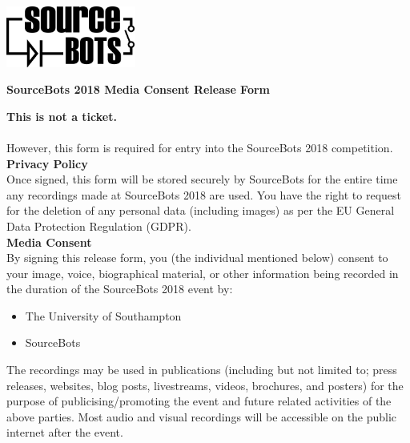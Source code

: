 \documentclass[a4paper]{article}
\begin{document}
\newcommand{\compyear}{2018\xspace}
\newcommand{\competition}{SourceBots \compyear}

\begin{minipage}[c]{0.30\textwidth}
\includegraphics[height=2cm]{fig-SourceBots}
\end{minipage}
\hspace{0.03\textwidth}
\begin{minipage}[c]{0.67\textwidth}
\begin{center}
{\large \textbf{\competition Media Consent Release Form} \par}
\end{center}
\end{minipage}
\vspace{1cm}

\textbf{This is not a ticket.}\\\\ However, this form is required for entry into the \competition competition.\\

\vspace{0.3cm}
\textbf{\large Privacy Policy}\\

Once signed, this form will be stored securely by SourceBots for the entire time any recordings made at \competition are used. You have the right to request for the deletion of any personal data (including images) as per the EU General Data Protection Regulation (GDPR).\\

\vspace{0.3cm}
\textbf{\large Media Consent}\\

By signing this release form, you (the individual mentioned below) consent to your image, voice, biographical material, or other information being recorded in the duration of the \competition event by:
\begin{itemize}
    \item The University of Southampton
    \item SourceBots
\end{itemize}
 The recordings may be used in publications (including but not limited to; press releases, websites, blog posts, livestreams, videos, brochures, and posters) for the purpose of publicising/promoting the event and future related activities of the above parties. Most audio and visual recordings will be accessible on the public internet after the event.
\end{document}
